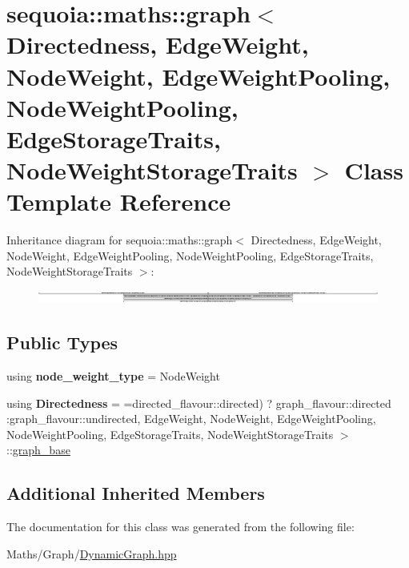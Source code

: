 \hypertarget{classsequoia_1_1maths_1_1graph}{}\section{sequoia\+::maths\+::graph$<$ Directedness, Edge\+Weight, Node\+Weight, Edge\+Weight\+Pooling, Node\+Weight\+Pooling, Edge\+Storage\+Traits, Node\+Weight\+Storage\+Traits $>$ Class Template Reference}
\label{classsequoia_1_1maths_1_1graph}
Inheritance diagram for sequoia\+::maths\+::graph$<$ Directedness, Edge\+Weight, Node\+Weight, Edge\+Weight\+Pooling, Node\+Weight\+Pooling, Edge\+Storage\+Traits, Node\+Weight\+Storage\+Traits $>$\+:\begin{figure}[H]
\begin{center}
\leavevmode
\includegraphics[height=0.428135cm]{classsequoia_1_1maths_1_1graph}
\end{center}
\end{figure}
\subsection*{Public Types}
\begin{DoxyCompactItemize}
\item 
\mbox{\label{classsequoia_1_1maths_1_1graph_a8c2b54d7398d59c7054c041fd01c9f2e}} 
using {\bfseries node\+\_\+weight\+\_\+type} = Node\+Weight
\item 
\mbox{\label{classsequoia_1_1maths_1_1graph_a8024f6e5140ca175cdfdf752b1db6d37}} 
using {\bfseries Directedness} = =directed\+\_\+flavour\+::directed) ? graph\+\_\+flavour\+::directed \+:graph\+\_\+flavour\+::undirected, Edge\+Weight, Node\+Weight, Edge\+Weight\+Pooling, Node\+Weight\+Pooling, Edge\+Storage\+Traits, Node\+Weight\+Storage\+Traits $>$\+::\mbox{\hyperlink{classsequoia_1_1maths_1_1graph__base}{graph\+\_\+base}}
\end{DoxyCompactItemize}
\subsection*{Additional Inherited Members}


The documentation for this class was generated from the following file\+:\begin{DoxyCompactItemize}
\item 
Maths/\+Graph/\mbox{\hyperlink{_dynamic_graph_8hpp}{Dynamic\+Graph.\+hpp}}\end{DoxyCompactItemize}
